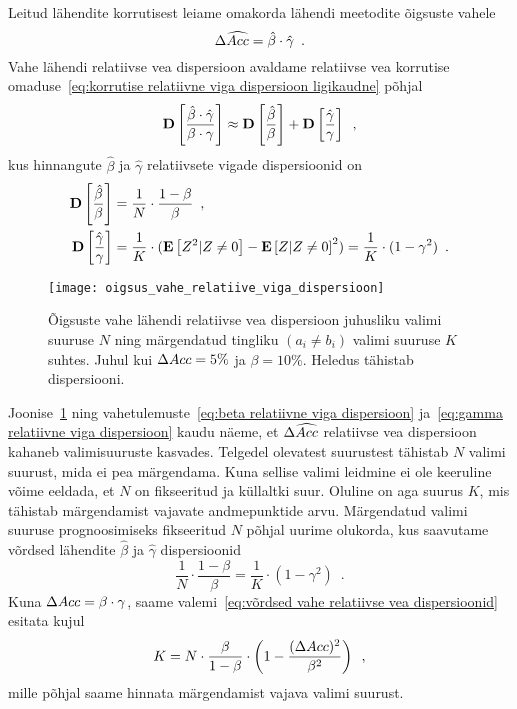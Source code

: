 Leitud lähendite korrutisest leiame omakorda lähendi meetodite õigsuste vahele
\begin{equation*}
    \Delta \widehat{Acc} = \hat{\beta} \cdot \hat{\gamma} \enspace.
\end{equation*}
Vahe lähendi relatiivse vea dispersioon avaldame relatiivse vea korrutise omaduse~\eqref{eq:korrutise relatiivne viga dispersioon ligikaudne} põhjal
\begin{equation}
    \operatorname*{\mathbf{D}}\left[\frac{\hat{\beta} \cdot \hat{\gamma}}{\beta \cdot \gamma}\right] \approx \operatorname*{\mathbf{D}}\left[\frac{\hat{\beta}}{\beta}\right] + \operatorname*{\mathbf{D}}\left[\frac{\hat{\gamma}}{\gamma}\right] \enspace,
\end{equation}
kus hinnangute $\hat{\beta}$ ja $\hat{\gamma}$ relatiivsete vigade dispersioonid on
\begin{align}
    \operatorname*{\mathbf{D}}\left[\frac{\hat{\beta}}{\beta}\right] &= \frac{1}{N} \cdot \frac{1 - \beta}{\beta} \enspace, \label{eq:beta relatiivne viga dispersioon} \\
    \operatorname*{\mathbf{D}}\left[\frac{\hat{\gamma}}{\gamma}\right] &= \frac{1}{K} \cdot (\operatorname*{\mathbf{E}}\left[Z^2 | Z \neq 0\right] - \operatorname*{\mathbf{E}}\left[Z | Z\neq 0\right]^2) = \frac{1}{K} \cdot (1 - \gamma^2) \enspace. \label{eq:gamma relatiivne viga dispersioon}
\end{align}
\begin{figure}[H]
    \begin{center}
        \texttt{[image: oigsus\_vahe\_relatiive\_viga\_dispersioon]}  
    \end{center}
    \caption{Õigsuste vahe lähendi relatiivse vea dispersioon juhusliku valimi suuruse $N$ ning märgendatud tingliku $(a_i \neq b_i)$ valimi suuruse $K$ suhtes. Juhul kui $\Delta Acc = 5\%$ ja $\beta = 10\%$. Heledus tähistab dispersiooni.}
    \label{fig:õigsus vahe lähend relatiivne viga dispersioon}
\end{figure}

Joonise~\ref{fig:õigsus vahe lähend relatiivne viga dispersioon} ning vahetulemuste~\eqref{eq:beta relatiivne viga dispersioon} ja~\eqref{eq:gamma relatiivne viga dispersioon} kaudu näeme, et $\Delta \widehat{Acc}$ relatiivse vea dispersioon kahaneb valimisuuruste kasvades. Telgedel olevatest suurustest tähistab $N$ valimi suurust, mida ei pea märgendama. Kuna sellise valimi leidmine ei ole keeruline võime eeldada, et $N$ on fikseeritud ja küllaltki suur. Oluline on aga suurus $K$, mis tähistab märgendamist vajavate andmepunktide arvu. Märgendatud valimi suuruse prognoosimiseks fikseeritud $N$ põhjal uurime olukorda, kus saavutame võrdsed lähendite $\hat{\beta}$ ja $\hat{\gamma}$ dispersioonid
\begin{equation}
    \label{eq:võrdsed vahe relatiivse vea dispersioonid}
    \frac{1}{N} \cdot \frac{1 - \beta}{\beta} = \frac{1}{K} \cdot (1 - \gamma^2) \enspace.
\end{equation}
Kuna $\Delta Acc = \beta \cdot \gamma$, saame valemi~\eqref{eq:võrdsed vahe relatiivse vea dispersioonid} esitata kujul
\begin{equation}    
    K = N \cdot \frac{\beta}{1-\beta} \cdot \left( 1 - \frac{(\Delta Acc)^2}{\beta^2} \right) \enspace,
\end{equation}
mille põhjal saame hinnata märgendamist vajava valimi suurust.

